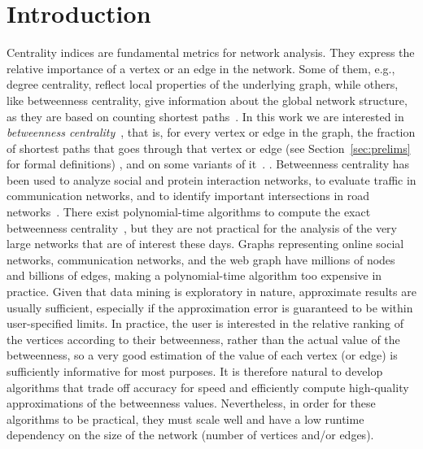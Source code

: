 \section{Introduction}\label{sec:intro}
Centrality indices are fundamental metrics for network analysis. They express the
relative importance of a vertex or an edge in the network. Some of them, e.g., degree
centrality, reflect local properties of the underlying graph, while others,
like betweenness centrality, give information about the global network
structure, as they are based on counting shortest paths~\citep{Newman10}. In
this work we are interested in \emph{betweenness
centrality}~\citep{Anthonisse71,Freeman77}, that is, for every vertex or edge in
the graph, the fraction of shortest paths that goes through that vertex or edge
(see Section~\ref{sec:prelims} for formal definitions)
\ifproof
, and on some variants of it~\citep{OpsahlAS10,BorgattiE06,Brandes08}. %
\else
. %
\fi
Betweenness centrality has been used to analyze social and protein interaction
networks, to evaluate traffic in communication networks, and to identify
important intersections in road networks~\citep{Newman10,GeisbergerSS08}. There
exist polynomial-time algorithms to compute the exact betweenness
centrality~\citep{Brandes01}, but they are not practical for the analysis of the
very large networks that are of interest these days. Graphs representing online
social networks, communication networks, and the web graph have millions of
nodes and billions of edges, making a polynomial-time algorithm too expensive in
practice. Given that data mining is exploratory in nature, approximate results
are usually sufficient, especially if the approximation error is guaranteed to
be within user-specified limits. In practice, the user is interested in the
relative ranking of the vertices according to their betweenness, rather than the
actual value of the betweenness, so a very good estimation of the value of each
vertex (or edge) is sufficiently informative for most purposes. It is therefore
natural to develop algorithms that trade off accuracy for speed and efficiently
compute high-quality approximations of the betweenness values. Nevertheless,
in order for these algorithms to be practical, they must scale well and have a
low runtime dependency on the size of the network (number of vertices and/or
edges).

